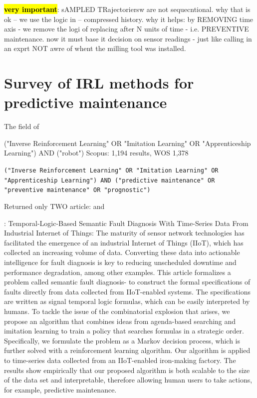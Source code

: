 \documentclass{article}
\newcommand{\hlc}[2][blue!10]{{\colorlet{foo}{#1} \sethlcolor{foo}\hl{#2}}}
\begin{document}
\hlc{\textbf{very important}}: sAMPLED TRajectoriersw  are not sequecntional. why that is ok -- we use the logic in \cite{berant2015imitation} -- compressed history. why it helps: by REMOVING time axis - we remove the logi of replacing after N units of time - i.e. PREVENTIVE maintenance. now it must base it decision on sensor readings - just like calling in an exprt NOT awre of whent the milling tool was installed.


\par


\section{Survey of IRL methods for predictive maintenance}

The field of 

("Inverse Reinforcement Learning" OR "Imitation Learning" OR "Apprenticeship Learning") AND ("robot") Scopus: 1,194  results, WOS 1,378



\texttt{("Inverse Reinforcement Learning" OR "Imitation Learning" OR "Apprenticeship Learning") AND ("predictive maintenance" OR "preventive maintenance" OR "prognostic")}

Returned only TWO article: \cite{Chen-2021-Temporal} and \cite{Pinciroli2022-752} 	

\cite{Chen-2021-Temporal}: Temporal-Logic-Based Semantic Fault Diagnosis With Time-Series Data From Industrial Internet of Things:
The maturity of sensor network technologies has facilitated the emergence of an industrial Internet of Things (IIoT), which has collected an increasing volume of data. Converting these data into actionable intelligence for fault diagnosis is key to reducing unscheduled downtime and performance degradation, among other examples. This article formalizes a problem called semantic fault diagnosis- to construct the formal specifications of faults directly from data collected from IIoT-enabled systems. The specifications are written as signal temporal logic formulas, which can be easily interpreted by humans. To tackle the issue of the combinatorial explosion that arises, we propose an algorithm that combines ideas from agenda-based searching and imitation learning to train a policy that searches formulas in a strategic order. Specifically, we formulate the problem as a Markov decision process, which is further solved with a reinforcement learning algorithm. Our algorithm is applied to time-series data collected from an IIoT-enabled iron-making factory. The results show empirically that our proposed algorithm is both scalable to the size of the data set and interpretable, therefore allowing human users to take actions, for example, predictive maintenance.
\end{document}
